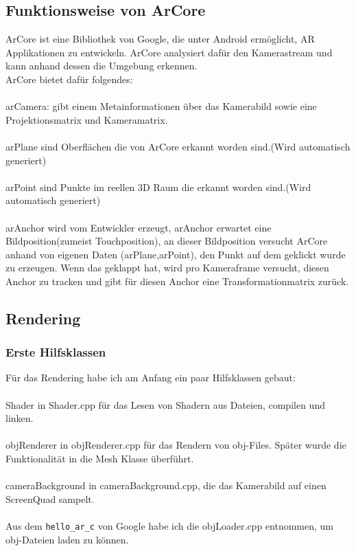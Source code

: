 \subsection{Funktionsweise von ArCore}
ArCore\cite{ar_core} ist eine Bibliothek von Google, die unter Android ermöglicht, AR Applikationen zu entwickeln.
ArCore analysiert dafür den Kamerastream und kann anhand dessen die Umgebung erkennen.\\
ArCore bietet dafür folgendes:
\\ \\
arCamera: gibt einem Metainformationen über das Kamerabild sowie eine Projektionsmatrix und Kameramatrix.
\\ \\
arPlane sind Oberflächen die von ArCore erkannt worden sind.(Wird automatisch generiert)
\\ \\
arPoint sind Punkte im reellen 3D Raum die erkannt worden sind.(Wird automatisch generiert)
\\ \\
arAnchor wird vom Entwickler erzeugt, arAnchor erwartet eine Bildposition(zumeist Touchposition), an dieser Bildposition versucht ArCore anhand von eigenen Daten (arPlane,arPoint), den Punkt auf dem geklickt wurde zu erzeugen. Wenn das geklappt hat, wird pro Kameraframe versucht, diesen Anchor zu tracken und gibt für diesen Anchor eine Transformationmatrix zurück.


\subsection{Rendering}
\subsubsection{Erste Hilfsklassen}
Für das Rendering habe ich am Anfang ein paar Hilfsklassen gebaut:\\ \\
Shader in Shader.cpp für das Lesen von Shadern aus Dateien, compilen und linken.\\ \\
objRenderer in objRenderer.cpp für das Rendern von obj-Files. Später wurde die
Funktionalität in die Mesh Klasse überführt.\\ \\
cameraBackground in cameraBackground.cpp, die das Kamerabild auf einen ScreenQuad sampelt.\\ \\
Aus dem \verb|hello_ar_c| von Google habe ich die objLoader.cpp entnommen, um obj-Dateien
laden zu können.
